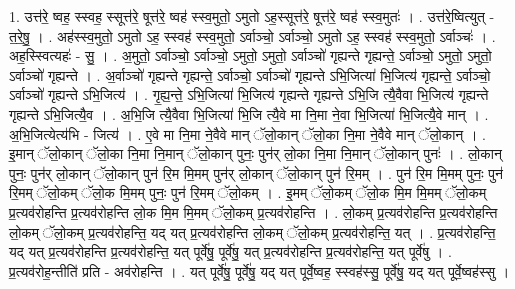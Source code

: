 \documentclass[17pt]{extarticle}
\begin{document}
1. उत्त॑रे॒ ष्वह॒ स्स्वह॒ स्सूत्त॑रे॒ षूत्त॑रे॒ ष्वह॑ स्स्व॒मुतो॒ ऽमुतो ऽह॒स्सूत्त॑रे॒ षूत्त॑रे॒ ष्वह॑ स्स्व॒मुतः॑ । . उत्त॑रे॒ष्वित्युत् - त॒रे॒षु॒ । . अह॑स्स्व॒मुतो॒ ऽमुतो ऽह॒ स्स्वह॑ स्स्व॒मुतो॒ ऽर्वाञ्चो॒ ऽर्वाञ्चो॒ ऽमुतो ऽह॒ स्स्वह॑ स्स्व॒मुतो॒ ऽर्वाञ्चः॑ । . अह॒स्स्वित्यहः॑ - सु॒ । . अ॒मुतो॒ ऽर्वाञ्चो॒ ऽर्वाञ्चो॒ ऽमुतो॒ ऽमुतो॒ ऽर्वाञ्चो॑ गृह्यन्ते गृह्यन्ते॒ ऽर्वाञ्चो॒ ऽमुतो॒ ऽमुतो॒ ऽर्वाञ्चो॑ गृह्यन्ते । . अ॒र्वाञ्चो॑ गृह्यन्ते गृह्यन्ते॒ ऽर्वाञ्चो॒ ऽर्वाञ्चो॑ गृह्यन्ते ऽभि॒जित्या॑ भि॒जित्य॑ गृह्यन्ते॒ ऽर्वाञ्चो॒ ऽर्वाञ्चो॑ गृह्यन्ते ऽभि॒जित्य॑ । . गृ॒ह्य॒न्ते॒ ऽभि॒जित्या॑ भि॒जित्य॑ गृह्यन्ते गृह्यन्ते ऽभि॒जि त्यै॒वैवा भि॒जित्य॑ गृह्यन्ते गृह्यन्ते ऽभि॒जित्यै॒व । . अ॒भि॒जि त्यै॒वैवा भि॒जित्या॑ भि॒जि त्यै॒वे मा नि॒मा ने॒वा भि॒जित्या॑ भि॒जित्यै॒वे मान् । . अ॒भि॒जित्येत्य॑भि - जित्य॑ । . ए॒वे मा नि॒मा ने॒वैवे मान् ॅलो॒कान् ॅलो॒का नि॒मा ने॒वैवे मान् ॅलो॒कान् । . इ॒मान् ॅलो॒कान् ॅलो॒का नि॒मा नि॒मान् ॅलो॒कान् पुनः॒ पुन॑र् लो॒का नि॒मा नि॒मान् ॅलो॒कान् पुनः॑ । . लो॒कान् पुनः॒ पुन॑र् लो॒कान् ॅलो॒कान् पुन॑ रि॒म मि॒मम् पुन॑र् लो॒कान् ॅलो॒कान् पुन॑ रि॒मम् । . पुन॑ रि॒म मि॒मम् पुनः॒ पुन॑ रि॒मम् ॅलो॒कम् ॅलो॒क मि॒मम् पुनः॒ पुन॑ रि॒मम् ॅलो॒कम् । . इ॒मम् ॅलो॒कम् ॅलो॒क मि॒म मि॒मम् ॅलो॒कम् प्र॒त्यव॑रोहन्ति प्र॒त्यव॑रोहन्ति लो॒क मि॒म मि॒मम् ॅलो॒कम् प्र॒त्यव॑रोहन्ति । . लो॒कम् प्र॒त्यव॑रोहन्ति प्र॒त्यव॑रोहन्ति लो॒कम् ॅलो॒कम् प्र॒त्यव॑रोहन्ति॒ यद् यत् प्र॒त्यव॑रोहन्ति लो॒कम् ॅलो॒कम् प्र॒त्यव॑रोहन्ति॒ यत् । . प्र॒त्यव॑रोहन्ति॒ यद् यत् प्र॒त्यव॑रोहन्ति प्र॒त्यव॑रोहन्ति॒ यत् पूर्वे॑षु॒ पूर्वे॑षु॒ यत् प्र॒त्यव॑रोहन्ति प्र॒त्यव॑रोहन्ति॒ यत् पूर्वे॑षु । . प्र॒त्यव॑रोह॒न्तीति॑ प्रति - अव॑रोहन्ति । . यत् पूर्वे॑षु॒ पूर्वे॑षु॒ यद् यत् पूर्वे॒ष्वह॒ स्स्वह॑स्सु॒ पूर्वे॑षु॒ यद् यत् पूर्वे॒ष्वह॑स्सु । \newline
\end{document}
